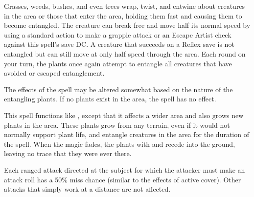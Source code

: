 \spellrng{\rngmed}
\begin{spelleffect}
  Grasses, weeds, bushes, and even trees wrap, twist, and entwine about creatures in the area or those that enter the area, holding them fast and causing them to become entangled. The creature can break free and move half its normal speed by using a standard action to make a grapple attack or an Escape Artist check against this spell's save DC. A creature that succeeds on a Reflex save is not entangled but can still move at only half speed through the area. Each round on your turn, the plants once again attempt to entangle all creatures that have avoided or escaped entanglement.
\end{spelleffect}
\begin{spellnotes}
  The effects of the spell may be altered somewhat based on the nature of the entangling plants. If no plants exist in the area, the spell has no effect.
\end{spellnotes}

\begin{spelleffect}
  This spell functions like , except that it affects a wider area and also grows new plants in the area. These plants grow from any terrain, even if it would not normally support plant life, and entangle creatures in the area for the duration of the spell. When the magic fades, the plants with and recede into the ground, leaving no trace that they were ever there.
\end{spelleffect}

\spellrng{\rngclose}
\begin{spelleffect}
  Each ranged attack directed at the subject for which the attacker must make an attack roll has a 50\% miss chance (similar to the effects of active cover). Other attacks that simply work at a distance are not affected.
\end{spelleffect}

